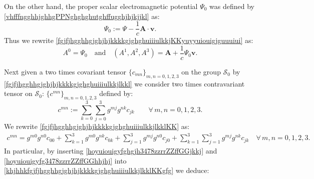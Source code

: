 \documentclass{article}
\theoremstyle{definition}
\theoremstyle{remark}
\renewcommand{\vec}[1]{\mathbf{#1}}
\newcommand{\er}{\eqref}
\newcommand{\er}{\eqref}
\begin{document}
On the other hand, the proper scalar electromagnetic potential
$\Psi_0$ was defined by
\er{vhfffngghhjghhgPPNghghghutghffugghjhjkjjkl} as:
\begin{equation}\label{vhfffngghhjghhgPPNghghghutghffugghjhjkjjklhjgh}
\Psi_0:=\Psi-\frac{1}{c}\vec A\cdot\vec v.
\end{equation}
Thus we rewrite
\er{fgjfjhgghhgjghjhjkkkkgjghghuiiiulkkjKKyuyyuiouigjguuuiui} as:
\begin{equation}\label{fgjfjhgghhgjghjhjkkkkgjghghuiiiulkkjKKyuyyuiouigjguuuiui1}
A^0=\Psi_0\quad\text{and}\quad(A^1,A^2,A^3)=\vec
A+\frac{1}{c}\Psi_0\vec v.
\end{equation}




Next given a two times covariant tensor $\{c_{mn}\}_{m,n=0,1,2,3}$
on the group $\mathcal{S}_0$ by
\er{fgjfjhgghhgjghjhjkkkkgjghghuiiiulkkjlkkl} we consider two times
contravariant tensor
on $\mathcal{S}_0$:
$\{c^{mn}\}_{m,n=0,1,2,3}$
defined
by:
\begin{equation}\label{fgjfjhgghhgjghjhjkkkkgjghghuiiiulkkjlkklKK}
c^{mn}:=\sum_{k=0}^{3}\sum_{j=0}^{3}g^{mj}g^{nk}c_{jk}
\quad\quad\forall\,
m,n=0,1,2,3.
\end{equation}
We rewrite \er{fgjfjhgghhgjghjhjkkkkgjghghuiiiulkkjlkklKK} as:
\begin{multline}\label{khjhhkfgjfjhgghhgjghjhjkkkkgjghghuiiiulkkjlkklKKgfg}
c^{mn}=g^{m0}g^{n0}c_{00}+\sum_{k=1}^{3}g^{m0}g^{nk}c_{0k}+\sum_{j=1}^{3}g^{mj}g^{n0}c_{j0}+\sum_{k=1}^{3}\sum_{j=1}^{3}g^{mj}g^{nk}c_{jk}
\quad\forall\,
m,n=0,1,2,3.
\end{multline}
In particular, by inserting \er{hoyuiouigyfghgjh3478zzrrZZffGGjkkj}
and \er{hoyuiouigyfg3478zzrrZZffGGhhjhj} into
\er{khjhhkfgjfjhgghhgjghjhjkkkkgjghghuiiiulkkjlkklKKgfg} we deduce:
\end{document}
